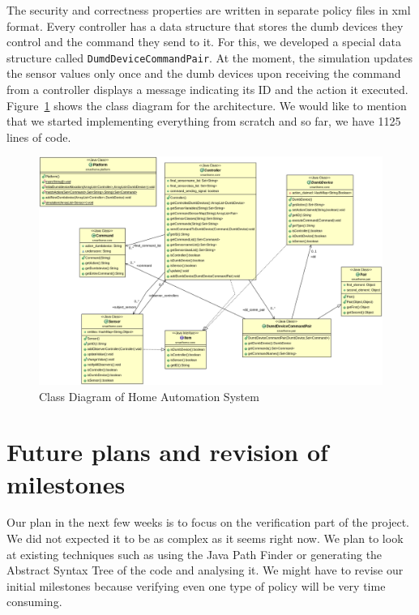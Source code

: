 \documentclass{article}
\begin{document}
The security and correctness properties are written in separate policy files in xml format. Every controller has a data structure that stores the dumb devices they control and the command they send to it. For this, we developed a special data structure called \texttt{DumdDeviceCommandPair}. At the moment, the simulation updates the sensor values only once and the dumb devices upon receiving the command from a controller displays a message indicating its ID and the action it executed. Figure~\ref{fig:classdia} shows the class diagram for the architecture. We would like to mention that we started implementing everything from scratch and so far, we have 1125 lines of code. 

\begin{figure}[h]
\includegraphics[scale=0.35, trim = 0 0 0 380]{classdiagram.png}
\caption{Class Diagram of Home Automation System}
\label{fig:classdia}
\end{figure}


\section{Future plans and revision of milestones}
Our plan in the next few weeks is to focus on the verification part of the project. We did not expected it to be as complex as it seems right now. We plan to look at existing techniques such as using the Java Path Finder or generating the Abstract Syntax Tree of the code and analysing it. We might have to revise our initial milestones because verifying even one type of policy will be very time consuming. 
\end{document}
